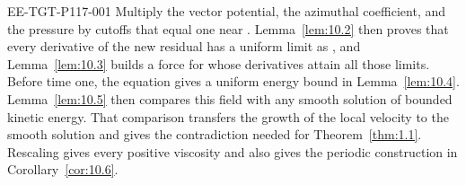 \begin{EESegment}{EE-TGT-P117-001}
Multiply the vector potential, the azimuthal coefficient, and the pressure by cutoffs that equal one
near . Lemma~\ref{lem:10.2} then proves that every derivative of the
new residual has a uniform limit as , and
Lemma~\ref{lem:10.3} builds a force for  whose derivatives attain all
those limits. Before time one, the equation gives a uniform energy bound in
Lemma~\ref{lem:10.4}. Lemma~\ref{lem:10.5} then compares this field with any smooth solution of
bounded kinetic energy. That comparison transfers the growth of the local velocity to the smooth
solution and gives the contradiction needed for Theorem~\ref{thm:1.1}. Rescaling gives every
positive viscosity and also gives the periodic construction in Corollary~\ref{cor:10.6}.
\end{EESegment}

